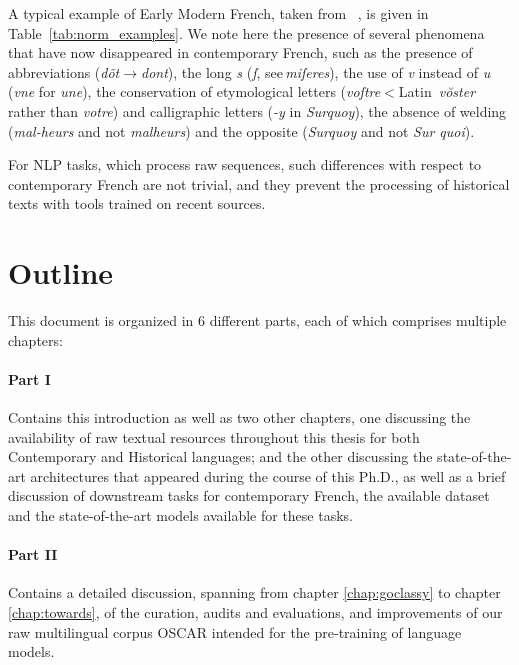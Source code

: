 A typical example of Early Modern French, taken from ~\citet{balzac-1624-lettres}, is given in Table~\ref{tab:norm_examples}. We note here the presence of several phenomena that have now disappeared in contemporary French, such as the presence of abbreviations (\emph{dõt}$\to$\emph{dont}), the long \emph{s} (\emph{ſ}, see\,\emph{miſeres}), the use of \emph{v} instead of \emph{u} (\emph{vne} for \emph{une}), the conservation of etymological letters (\emph{voſtre}$<$Latin~\emph{vŏster} rather than \emph{votre}) and calligraphic letters (\emph{-y} in \emph{Surquoy}), the absence of welding  (\emph{\mbox{mal-heurs}} and not \emph{malheurs}) and the opposite (\emph{Surquoy} and not \emph{Sur quoi}).

For NLP tasks, which process raw sequences, such differences with respect to contemporary French are not trivial, and they prevent the processing of historical texts with tools trained on recent sources.

\section{Outline}

This document is organized in 6 different parts, each of which comprises multiple chapters:

\paragraph{Part I} Contains this introduction as well as two other chapters, one discussing the availability of raw textual resources throughout this thesis for both Contemporary and Historical languages; and the other discussing the state-of-the-art architectures that appeared during the course of this Ph.D., as well as a brief discussion of downstream tasks for contemporary French, the available dataset and the state-of-the-art models available for these tasks.

\paragraph{Part II} Contains a detailed discussion, spanning from chapter \ref{chap:goclassy} to chapter \ref{chap:towards}, of the curation, audits and evaluations, and improvements of our raw multilingual corpus OSCAR \citep{ortiz-suarez-etal-2019-asynchronous,ortiz-suarez-etal-2020-monolingual,abadji-etal-2021-ungoliant,abadji-etal-2022-towards} intended for the pre-training of language models.

